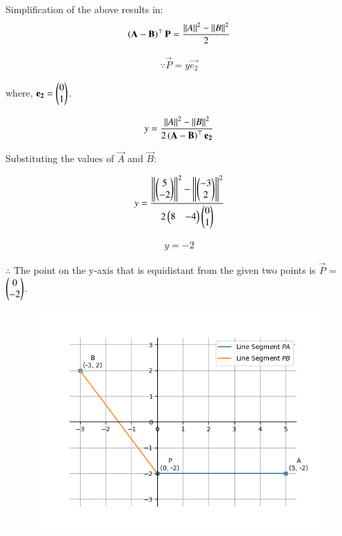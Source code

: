 \documentclass[journal]{IEEEtran}
\begin{document}
Simplification of the above results in:
\begin{align}
    \left(\mathbf{A}-\mathbf{B}\right)^\top\mathbf{P} = \frac{\left\lVert A\right\rVert^2 - \left\lVert B\right\rVert^2}{2} 
\end{align}

\begin{align}
    \because \vec{P} = y\vec{e_2}   
\end{align}

where, $\mathbf{e_2} = \begin{pmatrix}0\\1\end{pmatrix}$.

\begin{align}
    y = \frac{\left\lVert A\right\rVert^2-\left\lVert B\right\rVert^2}{2\left(\mathbf{A}-\mathbf{B}\right)^\top\mathbf{e_2}}
\end{align}

Substituting the values of $\vec{A}$ and $\vec{B}$:

\begin{align}
    y = \frac{\left\lVert\begin{pmatrix}5\\-2\end{pmatrix}\right\rVert^2 - \left\lVert\begin{pmatrix}-3 \\2\end{pmatrix}\right\rVert^2}{2\begin{pmatrix}8 & -4\end{pmatrix}\begin{pmatrix}0\\1\end{pmatrix}}
\end{align}

\begin{align}
    y = -2
\end{align}

$\therefore$ The point on the y-axis that is equidistant from the given two points is $\vec{P}$ = $\begin{pmatrix}0\\-2\end{pmatrix}$.

\begin{figure}[H]
    \centering
    \includegraphics[width=1\columnwidth]{Figs/plot(py).png}
\end{figure}
\end{document}
